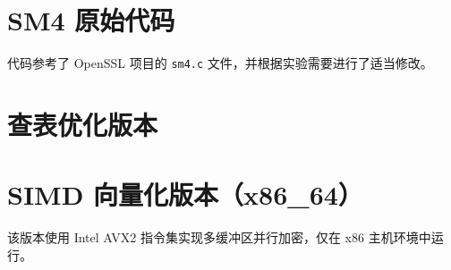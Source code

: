 \appendix

\section{SM4 原始代码}
代码参考了 OpenSSL 项目的 \verb|sm4.c| 文件，并根据实验需要进行了适当修改\cite{openssl-github}。


\section{查表优化版本}


\section{SIMD 向量化版本（x86\_64）}
该版本使用 Intel AVX2 指令集实现多缓冲区并行加密，仅在 x86 主机环境中运行。


% 

% 

% 

% 
